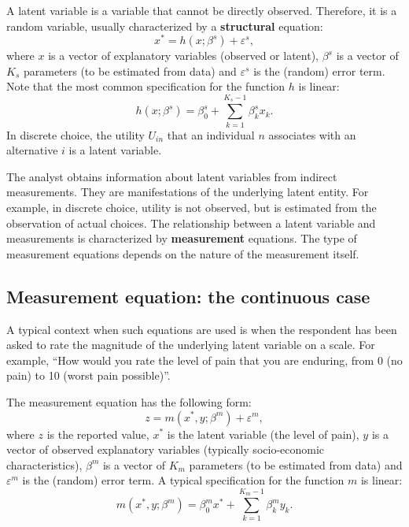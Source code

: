 \documentclass[12pt,a4paper]{article}
\begin{document}
A latent variable is a variable that cannot be directly
observed. Therefore, it is a random variable,
 usually characterized by a \textbf{structural} equation:
\begin{equation}
\label{eq:structural}
x^* = h(x;\beta^s) + \varepsilon^s,
\end{equation}
where $x$ is a vector of  explanatory variables (observed or latent), $\beta^s$ is
a vector of $K_s$ parameters (to be estimated from data) and $\varepsilon^s$
is the (random) error term. Note that the most common specification
for the function $h$ is linear:
\begin{equation}
h(x;\beta^s) = \beta_0^s + \sum_{k=1}^{K_s-1} \beta^s_k x_k.
\end{equation}
 In discrete choice, the utility $U_{in}$ that an individual $n$
 associates with an alternative $i$ is a latent variable.

The analyst obtains information about latent variables from indirect
measurements. They are manifestations of the underlying latent
entity.  For example, in discrete choice, utility is not observed, but
is estimated from the observation of actual choices. The relationship
between a latent variable and measurements is characterized by 
\textbf{measurement} equations. The type of measurement equations
depends on the nature of the measurement itself.

\subsection{Measurement equation: the continuous case}

A typical context when such equations are used is when the respondent
has been asked to rate the magnitude of the underlying latent
variable on a scale. For example, ``How would you rate the level of pain that you
are enduring, from 0 (no pain) to 10 (worst pain possible)''. 

The measurement equation has the following form:
\begin{equation}
\label{eq:continuousMeasurement}
z = m(x^*,y;\beta^m) + \varepsilon^m,
\end{equation}
where $z$ is the reported value, $x^*$ is the latent variable (the
level of pain), $y$ is a vector of observed explanatory
variables (typically socio-economic characteristics), $\beta^m$ is
a vector of $K_m$ parameters (to be estimated from data) and $\varepsilon^m$
is the (random) error term. A typical specification
for the function $m$ is linear:
\begin{equation}
m(x^*,y;\beta^m) = \beta^m_0 x^* + \sum_{k=1}^{K_m-1} \beta^m_k y_k.
\end{equation}
\end{document}
